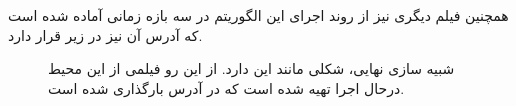 همچنین فیلم دیگری نیز از روند اجرای این الگوریتم در سه بازه زمانی آماده شده است که آدرس آن نیز در زیر قرار دارد.

\begin{center}
\end{center}










\begin{figure}
	\centering
	\caption[تصویر شبیه‌سازی نهایی]{
		شبیه سازی نهایی، شکلی مانند این دارد. از این رو فیلمی از این محیط درحال اجرا تهیه شده است که در آدرس
		بارگذاری شده است.		
	}	
	\label{fig:resault}
	
\end{figure}
















